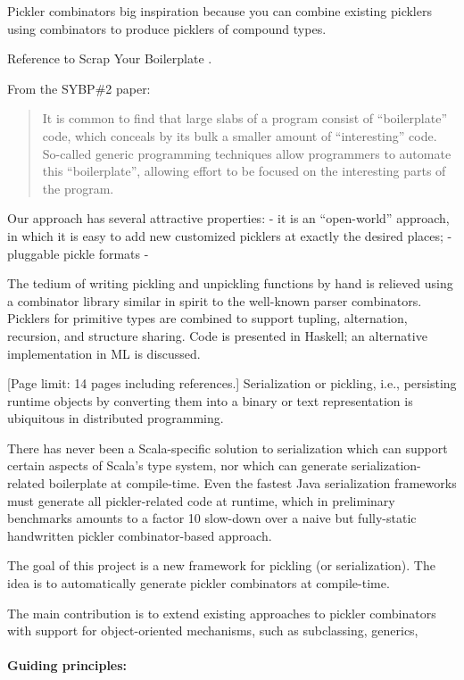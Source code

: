 \documentclass[preprint,10pt]{sigplanconf}
\begin{document}
Pickler combinators big inspiration because you can combine existing picklers using combinators to produce picklers of compound types.

Reference to Scrap Your Boilerplate \cite{Lammel2004}.

From the SYBP\#2 paper:
\begin{quote}
It is common to find that large slabs of a program consist of ``boilerplate'' code, which conceals by its bulk a smaller amount of ``interesting'' code. So-called generic programming techniques allow programmers to automate this ``boilerplate'', allowing effort to be focused on the interesting parts of the program.
\end{quote}

Our approach has several attractive properties:
- it is an ``open-world'' approach, in which it is easy to add new customized picklers at exactly the desired places;
- pluggable pickle formats
-

The tedium of writing pickling and unpickling functions by hand is relieved using a combinator library similar in spirit to the well-known parser combinators. Picklers for primitive
types are combined to support tupling, alternation, recursion, and structure sharing. Code
is presented in Haskell; an alternative implementation in ML is discussed.

[Page limit: 14 pages including references.]
Serialization or pickling, i.e., persisting runtime objects by
converting them into a binary or text representation is ubiquitous in
distributed programming.

There has never been a Scala-specific solution to serialization which
can support certain aspects of Scala's type system, nor which can
generate serialization-related boilerplate at compile-time. Even the
fastest Java serialization frameworks must generate all
pickler-related code at runtime, which in preliminary benchmarks
amounts to a factor 10 slow-down over a naive but fully-static handwritten pickler
combinator-based approach.

The goal of this project is a new framework for pickling (or
serialization). The idea is to automatically generate pickler
combinators at compile-time.

The main contribution is to extend existing approaches to
pickler combinators with support for object-oriented mechanisms, such
as subclassing, generics,

\paragraph{Guiding principles:}
\end{document}
